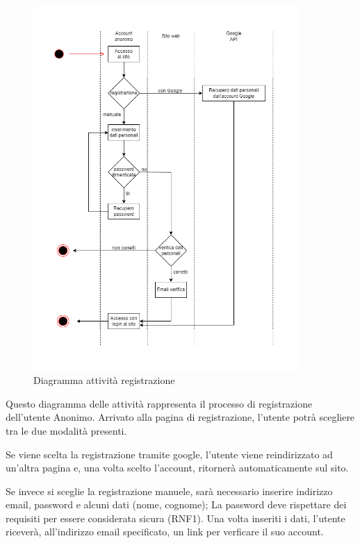 \documentclass[a4paper,12pt]{article}
\begin{document}
\begin{figure}[H]
   \centering
    \includegraphics[width=0.90\textwidth]{img-D2/diagramma_registrazione.png}
    \caption{Diagramma attività registrazione}
\end{figure}

Questo diagramma delle attività rappresenta il processo di registrazione dell'utente Anonimo. 
Arrivato alla pagina di registrazione, l'utente potrà scegliere tra le due modalità presenti.

Se viene scelta la registrazione tramite google, l'utente viene reindirizzato ad un'altra pagina e, una volta scelto l'account, ritornerà automaticamente sul sito.

Se invece si sceglie la registrazione manuele, sarà necessario inserire indirizzo email, password e alcuni dati (nome, cognome); La password deve rispettare dei requisiti per essere considerata sicura (RNF1).
Una volta inseriti i dati, l'utente riceverà, all'indirizzo email specificato, un link per verficare il suo account. 
\end{document}
